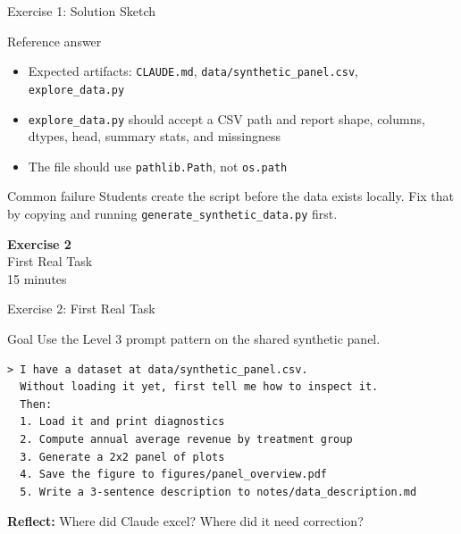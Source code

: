 \documentclass[aspectratio=169,10pt]{beamer}
\begin{document}
\begin{frame}{Exercise 1: Solution Sketch}
\small
\begin{exampleblock}{Reference answer}
\begin{itemize}\itemsep2pt
    \item Expected artifacts: \texttt{CLAUDE.md}, \texttt{data/synthetic\_panel.csv}, \texttt{explore\_data.py}
    \item \texttt{explore\_data.py} should accept a CSV path and report shape, columns, dtypes, head, summary stats, and missingness
    \item The file should use \texttt{pathlib.Path}, not \texttt{os.path}
\end{itemize}
\end{exampleblock}

\begin{alertblock}{Common failure}
Students create the script before the data exists locally. Fix that by copying
and running \texttt{generate\_synthetic\_data.py} first.
\end{alertblock}
\end{frame}

\begin{frame}{}
\vfill\begin{center}{\Huge \textcolor{uzhblue}{\textbf{Exercise 2}}}\\[12pt]
{\LARGE First Real Task}\\[6pt]{\small 15 minutes}\end{center}\vfill
\end{frame}

\begin{frame}[fragile]{Exercise 2: First Real Task}
\begin{exampleblock}{Goal}
Use the Level 3 prompt pattern on the shared synthetic panel.
\end{exampleblock}
\small
\begin{lstlisting}[style=prompt, basicstyle=\scriptsize\ttfamily]
> I have a dataset at data/synthetic_panel.csv.
  Without loading it yet, first tell me how to inspect it.
  Then:
  1. Load it and print diagnostics
  2. Compute annual average revenue by treatment group
  3. Generate a 2x2 panel of plots
  4. Save the figure to figures/panel_overview.pdf
  5. Write a 3-sentence description to notes/data_description.md
\end{lstlisting}

\textbf{Reflect:} Where did Claude excel? Where did it need correction?
\end{frame}
\end{document}
